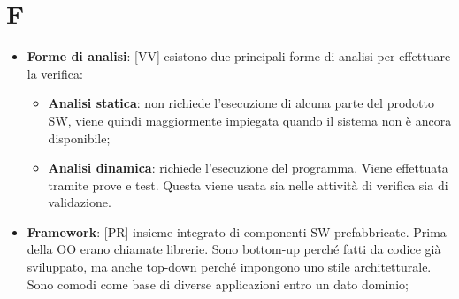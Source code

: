 % 
%
% 
%

\section{F}
	\begin{itemize}

		\item \textbf{Forme di analisi}: [VV] esistono due principali forme di analisi per effettuare la verifica:
			\begin{itemize}
				\item \textbf{Analisi statica}: non richiede l'esecuzione di alcuna parte del prodotto SW, viene quindi maggiormente impiegata quando il sistema non è ancora disponibile;
				\item \textbf{Analisi dinamica}: richiede l'esecuzione del programma. Viene effettuata tramite prove e test. Questa viene usata sia nelle attività di verifica sia di validazione.
			\end{itemize}

		\item \textbf{Framework}: [PR] insieme integrato di componenti SW prefabbricate. Prima della OO erano chiamate librerie. Sono bottom-up perché fatti da codice già sviluppato, ma anche top-down perché impongono uno stile architetturale. Sono comodi come base di diverse applicazioni entro un dato dominio;

	\end{itemize}